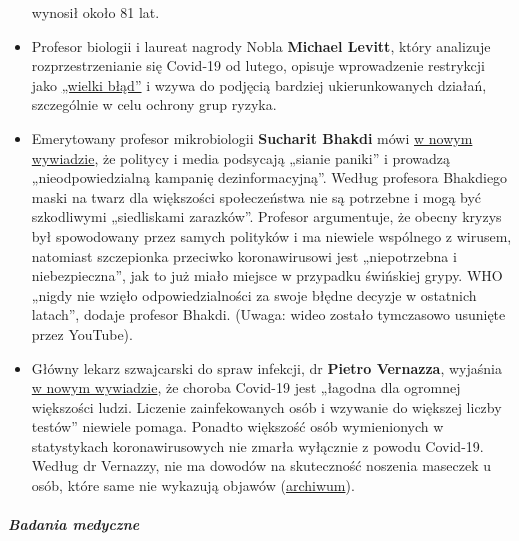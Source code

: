\begin{itemize}
  wynosił około 81 lat.
\item
  Profesor biologii i laureat nagrody Nobla \textbf{Michael Levitt},
  który analizuje rozprzestrzenianie się Covid-19 od lutego, opisuje
  wprowadzenie restrykcji jako
  \href{https://www.youtube.com/watch?v=bl-sZdfLcEk}{„wielki błąd''} i
  wzywa do podjęcią bardziej ukierunkowanych działań, szczególnie w celu
  ochrony grup ryzyka.
\item
  Emerytowany profesor mikrobiologii \textbf{Sucharit Bhakdi} mówi
  \href{https://www.servustv.com/videos/aa-23zjmvcz51w12/}{w nowym
  wywiadzie}, że politycy i media podsycają „sianie paniki'' i prowadzą
  „nieodpowiedzialną kampanię dezinformacyjną''. Według profesora
  Bhakdiego maski na twarz dla większości społeczeństwa nie są potrzebne
  i mogą być szkodliwymi „siedliskami zarazków''. Profesor argumentuje,
  że obecny kryzys był spowodowany przez samych polityków i ma niewiele
  wspólnego z wirusem, natomiast szczepionka przeciwko koronawirusowi
  jest „niepotrzebna i niebezpieczna'', jak to już miało miejsce w
  przypadku świńskiej grypy. WHO „nigdy nie wzięło odpowiedzialności za
  swoje błędne decyzje w ostatnich latach'', dodaje profesor Bhakdi.
  (Uwaga: wideo zostało tymczasowo usunięte przez YouTube).
\item
  Główny lekarz szwajcarski do spraw infekcji, dr \textbf{Pietro
  Vernazza}, wyjaśnia
  \href{https://www.saldo.ch/artikel/artikeldetail/fuer-die-allermeisten-menschen-verlaeuft-die-erkrankung-mild/}{w
  nowym wywiadzie}, że choroba Covid-19 jest „łagodna dla ogromnej
  większości ludzi. Liczenie zainfekowanych osób i wzywanie do większej
  liczby testów'' niewiele pomaga. Ponadto większość osób wymienionych w
  statystykach koronawirusowych nie zmarła wyłącznie z powodu Covid-19.
  Według dr Vernazzy, nie ma dowodów na skuteczność noszenia maseczek u
  osób, które same nie wykazują objawów
  (\href{https://swprs.files.wordpress.com/2020/05/saldo-interview-pietro-vernazza-14-04-2020.pdf}{archiwum}).
\end{itemize}

\hypertarget{badania-medyczne}{%
\subparagraph{\texorpdfstring{\textbf{Badania
medyczne}}{Badania medyczne}}\label{badania-medyczne}}

